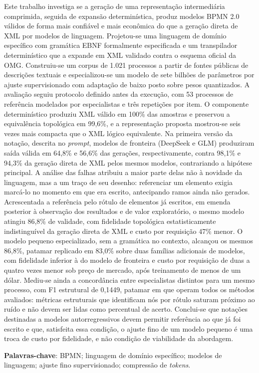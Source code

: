 Este trabalho investiga se a geração de uma representação intermediária comprimida, seguida de expansão determinística, produz modelos BPMN 2.0 válidos de forma mais confiável e mais econômica do que a geração direta de XML por modelos de linguagem. Projetou-se uma linguagem de domínio específico com gramática EBNF formalmente especificada e um transpilador determinístico que a expande em XML validado contra o esquema oficial da OMG. Construiu-se um corpus de 1.021 processos a partir de fontes públicas de descrições textuais e especializou-se um modelo de sete bilhões de parâmetros por ajuste supervisionado com adaptação de baixo posto sobre pesos quantizados. A avaliação seguiu protocolo definido antes da execução, com 53 processos de referência modelados por especialistas e três repetições por item. O componente determinístico produziu XML válido em 100\% das amostras e preservou a equivalência topológica em 99,6\%, e a representação proposta mostrou-se seis vezes mais compacta que o XML lógico equivalente. Na primeira versão da notação, descrita no \textit{prompt}, modelos de fronteira (DeepSeek e GLM) produziram saída válida em 64,8\% e 56,6\% das gerações, respectivamente, contra 98,1\% e 94,3\% da geração direta de XML pelos mesmos modelos, contrariando a hipótese principal. A análise das falhas atribuiu a maior parte delas não à novidade da linguagem, mas a um traço de seu desenho: referenciar um elemento exigia marcá-lo no momento em que era escrito, antecipando ramos ainda não gerados. Acrescentada a referência pelo rótulo de elementos já escritos, em emenda posterior à observação dos resultados e de valor exploratório, o mesmo modelo atingiu 86,8\% de validade, com fidelidade topológica estatisticamente indistinguível da geração direta de XML e custo por requisição 47\% menor. O modelo pequeno especializado, sem a gramática no contexto, alcançou os mesmos 86,8\%, patamar replicado em 83,0\% sobre duas famílias adicionais de modelos, com fidelidade inferior à do modelo de fronteira e custo por requisição de duas a quatro vezes menor sob preço de mercado, após treinamento de menos de um dólar. Mediu-se ainda a concordância entre especialistas distintos para um mesmo processo, com F1 estrutural de 0,1449, patamar em que operam todos os métodos avaliados: métricas estruturais que identificam nós por rótulo saturam próximo ao ruído e não devem ser lidas como percentual de acerto. Conclui-se que notações destinadas a modelos autorregressivos devem permitir referência ao que já foi escrito e que, satisfeita essa condição, o ajuste fino de um modelo pequeno é uma troca de custo por fidelidade, e não condição de viabilidade da abordagem.

\textbf{Palavras-chave}: BPMN; linguagem de domínio específico; modelos de linguagem; ajuste fino supervisionado; compressão de \textit{tokens}.
